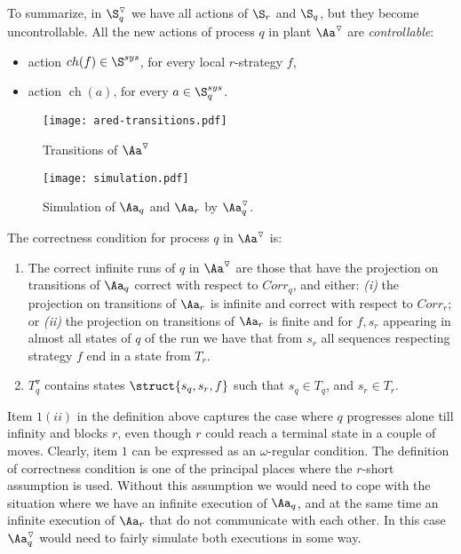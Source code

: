 \documentclass[10pt,a4paper]{article}
\newcommand{\igw}[1]{}
\newcommand{\Cor}{\mathit{Corr}}
\newcommand{\red}[1]{#1^\triangledown}
\newcommand{\Ssys}{\S^{sys}}
\newcommand{\ch}{\mathop{ch}}
\begin{document}
To summarize, in $\red\S_q$ we have all actions of $\S_r$ and $\S_q$,
but they become uncontrollable. All the new actions of
process $q$ in plant $\red\Aa$ are \emph{controllable}:
\begin{itemize}
\item action $\ch(f) \in \Ssys$, for every local $r$-strategy $f$,
\item action $\ch(a)$, for every $a\in\Ssys_q$.
\end{itemize}
\begin{figure}[tbp]
  \centering
\texttt{[image: ared-transitions.pdf]}
  \caption{Transitions of $\red\Aa$}\label{fig:transitions}
\end{figure}

\begin{figure}[tbp]
  \centering
\texttt{[image: simulation.pdf]}
  \caption{Simulation of $\Aa_q$ and $\Aa_r$ by $\red\Aa_q$.}\label{fig:simulation}
\end{figure}
The correctness condition for process $q$ in $\red\Aa$ is:
\begin{enumerate}
\item The correct infinite runs of $q$ in $\red\Aa$ are those that have
  the projection on transitions of $\Aa_q$ correct with respect to $\Cor_q$, and
  either: \emph{(i)} the projection on transitions of $\Aa_r$ is infinite and
  correct with respect to $\Cor_r$; or \emph{(ii)} the projection on
  transitions of $\Aa_r$ is finite and for $f,s_r$ appearing in almost
  all states of $q$ of the run we have that from $s_r$ all sequences
  respecting strategy $f$ end in a state from $T_r$.
\item $\red T_q$ contains states $\struct{s_q,s_r,f}$ such that
  $s_q\in T_q$, and $s_r\in T_r$.
\end{enumerate}
Item $1 (ii)$ in the  definition above captures the case where $q$ progresses alone till infinity and blocks
$r$, even though $r$ could reach a terminal state in a couple of
moves. Clearly, item $1$ can be expressed as an $\omega$-regular
condition. \igw{added some explanations} The definition of correctness condition is one of the
principal places where the $r$-short assumption is used. Without this
assumption we would need to cope with the situation where we have an
infinite execution of $\Aa_q$, and at the same time an infinite
execution of $\Aa_r$ that do not communicate with each other. In this
case $\red\Aa_q$ would need to fairly simulate both executions in some way.
\end{document}
